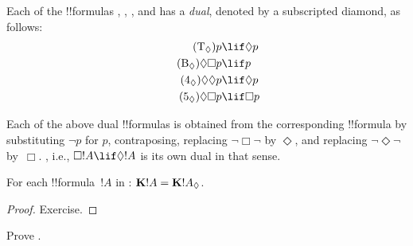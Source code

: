 \documentclass[../../../include/open-logic-section]{subfiles}
\begin{document}


\begin{defn}
  Each of the !!{formula}s , , , and
   has a \emph{dual}, denoted by a subscripted diamond, as
  follows:
  \begin{align}
    \tag{\Ax{T_\Diamond}} p & \lif \Diamond p\\
    \tag{\Ax{B_\Diamond}} \Diamond\Box p & \lif p\\
    \tag{\Ax{4_\Diamond}} \Diamond\Diamond p & \lif \Diamond p\\
    \tag{\Ax{5_\Diamond}} \Diamond\Box p & \lif \Box p
    \end{align}
\end{defn}

Each of the above dual !!{formula}s is obtained from the corresponding
!!{formula} by substituting $\lnot p$ for $p$, contraposing, replacing
$\lnot\Box\lnot$ by $\Diamond$, and replacing $\lnot\Diamond\lnot$
by~$\Box$. , i.e., $\Box!A \lif \Diamond!A$ is its own dual in
that sense.

\begin{prop}
  For each !!{formula}~$!A$ in :
  $\Log{K}!A = \Log{K}!A_{\Diamond}$.
\end{prop}
\begin{proof}
  Exercise.
\end{proof}
\begin{prob}
  Prove .
\end{prob}
\end{document}
